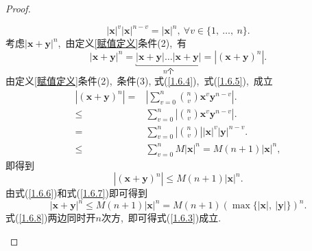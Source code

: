\documentclass[UTF8, twoside]{ctexart}
\theoremstyle{nonumberplain}
\newtheorem{proof}{\heiti 证明}  %
\theoremstyle{nonumberplain}
\theoremstyle{plain}
\begin{document}
\begin{proof}
\begin{enumerate}
\begin{enumerate}
\begin{equation}
					\left| \bm{x} \right|^v \left| \bm{x} \right| ^{n-v} = 
					\left| \bm{x} \right| ^n,
					\ \forall v \in \{1,\ \dots,\ n\}.
				\end{equation}
				考虑$\left| \bm{x}+\bm{y} \right|^n$,\ 由定义\ref{赋值定义}条件(2),\ 有
				\begin{equation} \label{1.6.6}
					\left| \bm{x}+\bm{y} \right|^n = 
					\underbracket{\left| \bm{x}+\bm{y} \right| \dots \left| \bm{x}+\bm{y} \right|}_{n\text{个}} = 
					\left| \left( \bm{x}+\bm{y} \right)^n \right|.
				\end{equation}
				由定义\ref{赋值定义}条件(2),\ 条件(3), 式(\ref{1.6.4}),\ 式(\ref{1.6.5}),\ 成立
				\begin{align*}
					\left| \left( \bm{x}+\bm{y} \right) ^n \right|
					=& \left| \sum_{v=0}^{n} \binom{n}{v} \bm{x}^v \bm{y}^{n-v} \right|.\\
					\le& \sum_{v=0}^{n} \left| \binom{n}{v}  \bm{x} ^v  \bm{y}^{n-v} \right|. \\
					=& \sum_{v=0}^{n} \left| \binom{n}{v} \right| \left| \bm{x} \right|^v \left| \bm{y} \right|^{n-v}. \\
					\le&  \sum_{v=0}^{n} M \left| \bm{x} \right|^n
					= M\left( n+1 \right) \left| \bm{x} \right| ^n,
				\end{align*} 
				即得到
				\begin{equation} \label{1.6.7}
					\left| \left( \bm{x}+\bm{y} \right)^n \right| \le M \left( n+1 \right) \left| \bm{x} \right| ^n.
				\end{equation}
				由式(\ref{1.6.6})和式(\ref{1.6.7})即可得到
				\begin{equation} \label{1.6.8}
					\left| \bm{x} + \bm{y} \right|^n \le
					M \left( n+1 \right) \left| \bm{x} \right|^n = 
					M \left( n+1 \right) \left( \max\{\left| \bm{x} \right|,\ \left| \bm{y} \right|\} \right) ^n.
				\end{equation}
				式(\ref{1.6.8})两边同时开$n$次方,\ 即可得式(\ref{1.6.3})成立.\ 
				\vskip 0.3cm
				

\end{enumerate}
\end{enumerate}
\end{proof}
\end{document}
